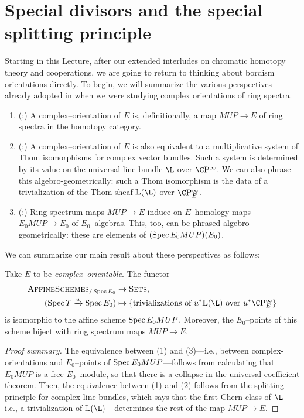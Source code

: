 \section{Special divisors and the special splitting principle}\label{MSUDay}

Starting in this Lecture, after our extended interludes on chromatic homotopy theory and cooperations, we are going to return to thinking about bordism orientations directly.  To begin, we will summarize the various perspectives already adopted in  when we were studying complex orientations of ring spectra.
\begin{enumerate}
\item (:) A complex--orientation of $E$ is, definitionally, a map $MUP \to E$ of ring spectra in the homotopy category.
\item (:) A complex--orientation of $E$ is also equivalent to a multiplicative system of Thom isomorphisms for complex vector bundles.  Such a system is determined by its value on the universal line bundle $\L$ over $\CP^\infty$.  We can also phrase this algebro-geometrically: such a Thom isomorphism is the data of a trivialization of the Thom sheaf $\ThomSheaf{\L}$ over $\CP^\infty_E$.
\item (:) Ring spectrum maps $MUP \to E$ induce on $E$--homology maps $E_0 MUP \to E_0$ of $E_0$--algebras.  This, too, can be phrased algebro-geometrically: these are elements of $(\operatorname{Spec} E_0 MUP)(E_0)$.
\end{enumerate}
We can summarize our main result about these perspectives as follows:
\begin{theorem}\label{BUZTriumvirate}
Take $E$ to be \emph{complex--orientable}.  The functor
\begin{align*}
\CatOf{AffineSchemes}_{/\Spec E_0} & \to \CatOf{Sets}, \\
(\Spec T \xrightarrow{u} \Spec E_0) & \mapsto \left\{ \text{trivializations of $u^* \ThomSheaf{\L}$ over $u^* \CP^\infty_E$} \right\}
\end{align*}
is isomorphic to the affine scheme $\operatorname{Spec} E_0 MUP$.  Moreover, the $E_0$--points of this scheme biject with ring spectrum maps $MUP \to E$.
\end{theorem}
\begin{proof}[Proof summary]
The equivalence between (1) and (3)---i.e., between complex-orientations and $E_0$--points of $\operatorname{Spec} E_0 MUP$---follows from calculating that $E_0 MUP$ is a free $E_0$--module, so that there is a collapse in the universal coefficient theorem.  Then, the equivalence between (1) and (2) follows from the splitting principle for complex line bundles, which says that the first Chern class of $\L$---i.e., a trivialization of $\ThomSheaf{\L}$---determines the rest of the map $MUP \to E$.
\end{proof}


